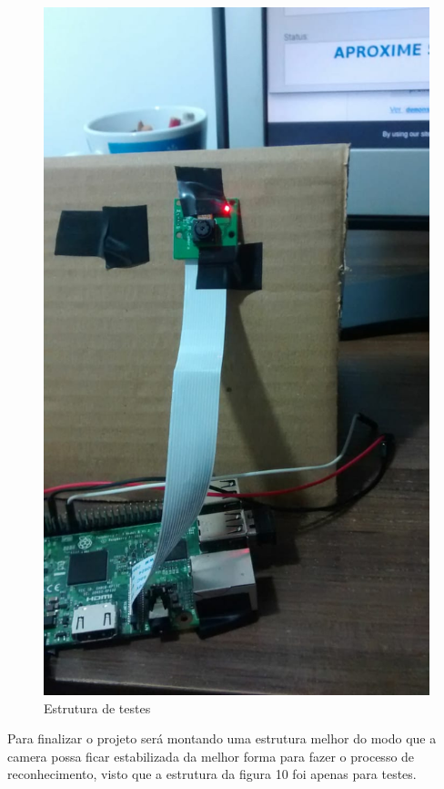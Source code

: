 \documentclass[conference,compsoc]{IEEEtran}
\begin{document}
	\begin{figure}[!ht]
		\centering
		\includegraphics[scale=0.15]{pi.jpeg}
		\caption{Estrutura de testes}
\end{figure}

Para finalizar o projeto será montando uma estrutura melhor do modo que a camera possa ficar estabilizada da melhor forma para fazer o processo de reconhecimento, visto que a estrutura da figura 10 foi apenas para testes. 
         
\end{document}
